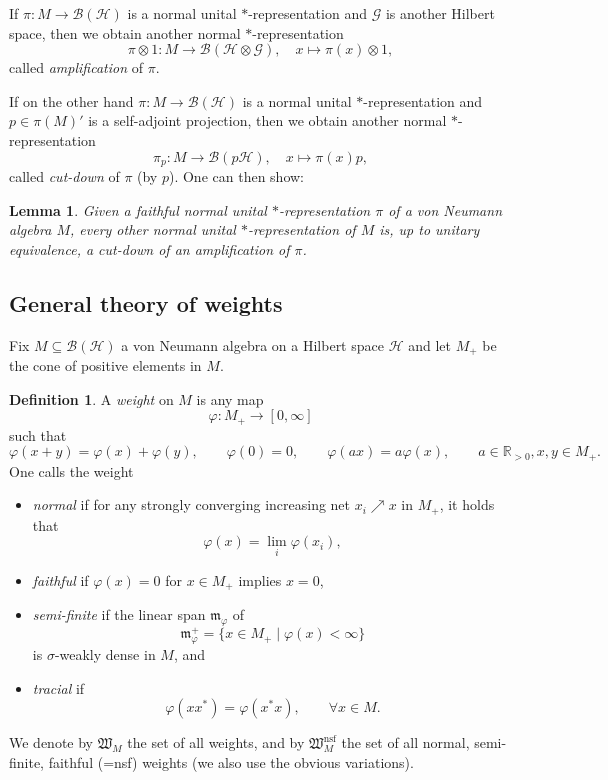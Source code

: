 \documentclass[11pt, reqno]{amsart}
\newtheorem{lemma}[theorem]{Lemma}
\theoremstyle{definition}
\newtheorem{defn}[theorem]{Definition}
\numberwithin{equation}{section}
\def\Gc{\mathcal G}
\def\Hc{\mathcal H}
\def\R{\mathbb R}
\newcommand{\Hsp}{\mathcal{H}}
\newcommand{\Bc}{\mathcal{B}}
\newcommand{\nsf}{\mathrm{nsf}}
\begin{document}
If $\pi\colon  M \rightarrow \Bc(\Hsp)$ is a normal unital $*$-representation and $\Gc$ is another Hilbert space, then we obtain another normal $*$-representation 
\[
\pi \otimes 1\colon  M \rightarrow \Bc(\Hsp \otimes \Gc),\quad x\mapsto \pi(x)\otimes 1,
\]
called \emph{amplification} of $\pi$. 

If on the other hand $\pi\colon  M \rightarrow \Bc(\Hsp)$ is a normal unital $*$-representation and $p \in \pi(M)'$ is a self-adjoint projection, then we obtain another normal $*$-representation 
\[
\pi_p\colon  M \rightarrow \Bc(p\Hsp),\quad x\mapsto \pi(x)p,
\]
called \emph{cut-down} of $\pi$ (by $p$). One can then show:
\begin{lemma}\label{LemCutAmp}
Given a faithful normal unital $*$-representation $\pi$ of a von Neumann algebra $M$, every other normal unital $*$-representation of $M$ is, up to unitary equivalence, a cut-down of an amplification of $\pi$. 
\end{lemma}










\subsection{General theory of weights}



Fix $M \subseteq \Bc(\Hc)$ a von Neumann algebra on a Hilbert space $\Hsp$ and let $M_+$ be the cone of positive elements in $M$.
\begin{defn}
A \emph{weight} on $M$ is any map 
\[
\varphi\colon  M_+ \rightarrow [0,\infty]
\]
such that
\[
\varphi(x+y) = \varphi(x)+\varphi(y),\qquad \varphi(0) = 0,\qquad  \varphi(ax) = a\varphi(x),\qquad a\in \R_{>0}, x,y\in M_+.
\]
One calls the weight 
\begin{itemize}
\item \emph{normal} if for any strongly converging increasing net $x_{i}\nearrow x$ in $M_+$, it holds that 
\[
\varphi(x) = \lim_{i} \varphi(x_i),
\]
\item \emph{faithful} if $\varphi(x)=0$ for $x\in M_+$ implies $x=0$, 
\item \emph{semi-finite} if the linear span $\mathfrak{m}_{\varphi}$ of 
\[
\mathfrak{m}_{\varphi}^+ = \{x\in M_+\mid \varphi(x)<\infty\}
\]
is $\sigma$-weakly dense in $M$, and
\item \emph{tracial} if 
\[
\varphi(xx^*) = \varphi(x^*x),\qquad \forall x\in M.
\]
\end{itemize}
We denote by $\mathfrak{W}_M$ the set of all weights, and by $\mathfrak{W}_M^{\nsf}$ the set of all normal, semi-finite, faithful (=nsf) weights (we also use the obvious variations).
\end{defn}
\end{document}

